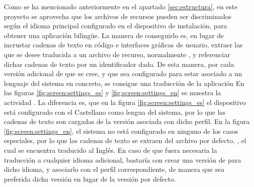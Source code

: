     Como se ha mencionado anteriormente en el apartado \ref{sec:estructura}, en este proyecto se aprovecha que los archivos de recursos pueden ser discriminados según el idioma principal configurado en el dispositivo de instalación, para obtener una aplicación bilingüe. La manera de conseguirlo es, en lugar de incrustar cadenas de texto en código e interfaces gráficas de usuario, extraer las que se desee traducida a un archivo de recurso, normalmente , y referenciar dichas cadenas de texto por un identificador dado. De esta manera, por cada versión adicional de  que se cree, y que sea configurado para estar asociado a un lenguaje del sistema en concreto, se consigue una traducción de la aplicación
    En las figuras \ref{fig:screen:settings_es} y \ref{fig:screen:settings_en} se muestra la actividad . La diferencia es, que en la figura \ref{fig:screen:settings_es} el dispositivo está configurado con el Castellano como lengua del sistema, por lo que las cadenas de texto son cargadas de la versión  asociada con dicho perfil. En la figura \ref{fig:screen:settings_en}, el sistema no está configurado en ninguno de los casos especiales, por lo que las cadenas de texto se extraen del archivo por defecto, , el cual se encuentra traducido al Inglés.
    En caso de que fuera necesaria la traducción a cualquier idioma adicional, bastaría con crear una versión de  para dicho idioma, y asociarlo con el perfil correspondiente, de manera que sea preferida dicha versión en lugar de la versión por defecto.
    
